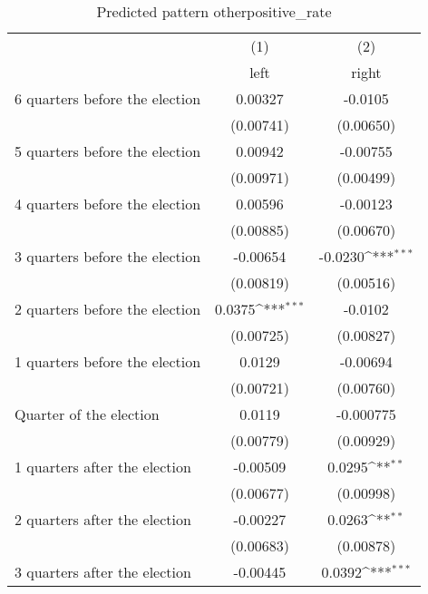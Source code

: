 \begin{table}[htbp]\centering
\def\sym#1{\ifmmode^{#1}\else\(^{#1}\)\fi}
\caption{Predicted pattern otherpositive\_rate}
\begin{tabular}{l*{2}{c}}
\hline\hline
                    &\multicolumn{1}{c}{(1)}&\multicolumn{1}{c}{(2)}\\
                    &\multicolumn{1}{c}{left}&\multicolumn{1}{c}{right}\\
\hline
 6 quarters before the election&     0.00327         &     -0.0105         \\
                    &   (0.00741)         &   (0.00650)         \\
[1em]
 5 quarters before the election&     0.00942         &    -0.00755         \\
                    &   (0.00971)         &   (0.00499)         \\
[1em]
 4 quarters before the election&     0.00596         &    -0.00123         \\
                    &   (0.00885)         &   (0.00670)         \\
[1em]
 3 quarters before the election&    -0.00654         &     -0.0230\sym{***}\\
                    &   (0.00819)         &   (0.00516)         \\
[1em]
 2 quarters before the election&      0.0375\sym{***}&     -0.0102         \\
                    &   (0.00725)         &   (0.00827)         \\
[1em]
 1 quarters before the election&      0.0129         &    -0.00694         \\
                    &   (0.00721)         &   (0.00760)         \\
[1em]
Quarter of the election&      0.0119         &   -0.000775         \\
                    &   (0.00779)         &   (0.00929)         \\
[1em]
 1 quarters after the election&    -0.00509         &      0.0295\sym{**} \\
                    &   (0.00677)         &   (0.00998)         \\
[1em]
 2 quarters after the election&    -0.00227         &      0.0263\sym{**} \\
                    &   (0.00683)         &   (0.00878)         \\
[1em]
 3 quarters after the election&    -0.00445         &      0.0392\sym{***}\\

\end{tabular}
\end{table}
